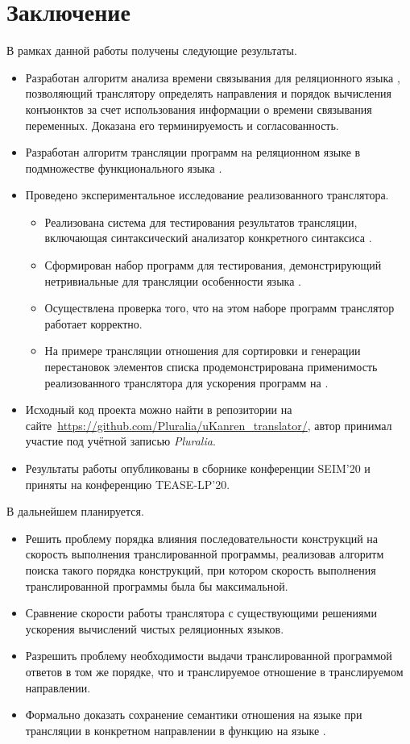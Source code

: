 \section*{Заключение}

В рамках данной работы получены следующие результаты.

\begin{itemize}
\item Разработан алгоритм анализа времени связывания для реляционного языка  \miniKanren{}, позволяющий транслятору определять направления и порядок вычисления конъюнктов за счет использования информации о времени связывания переменных. Доказана его терминируемость и согласованность. 
\item Разработан алгоритм трансляции программ на реляционном языке \miniKanren{} в подмножестве функционального языка \haskell{}.

\item Проведено экспериментальное исследование реализованного транслятора. 
\begin{itemize}
    \item Реализована система для тестирования результатов трансляции, включающая синтаксический анализатор конкретного синтаксиса \miniKanren{}.
    \item Сформирован набор программ для тестирования, демонстрирующий нетривиальные для трансляции особенности языка \miniKanren{}. 
    \item Осуществлена проверка того, что на этом наборе программ транслятор работает корректно. 
    \item На примере трансляции отношения для сортировки и генерации перестановок элементов списка продемонстрирована применимость реализованного транслятора для ускорения программ на \miniKanren{}.
\end{itemize}

\item Исходный код проекта можно найти в репозитории на сайте~\url{https://github.com/Pluralia/uKanren_translator/}, автор принимал участие под учётной записью \emph{Pluralia}.
\item Результаты работы опубликованы в сборнике конференции SEIM'20 и приняты на конференцию TEASE-LP'20.
\end{itemize}

В дальнейшем планируется.
\begin{itemize}
    \item Решить проблему порядка влияния последовательности конструкций на скорость выполнения транслированной программы, реализовав алгоритм поиска такого порядка конструкций, при котором скорость выполнения транслированной программы была бы максимальной.
    \item Сравнение скорости работы транслятора с существующими решениями ускорения вычислений чистых реляционных языков. 
    \item Разрешить проблему необходимости выдачи транслированной программой ответов в том же порядке, что и транслируемое отношение в транслируемом направлении.
    \item Формально доказать сохранение семантики отношения на языке \miniKanren{} при трансляции в конкретном направлении в функцию на языке \haskell{}.
\end{itemize}
